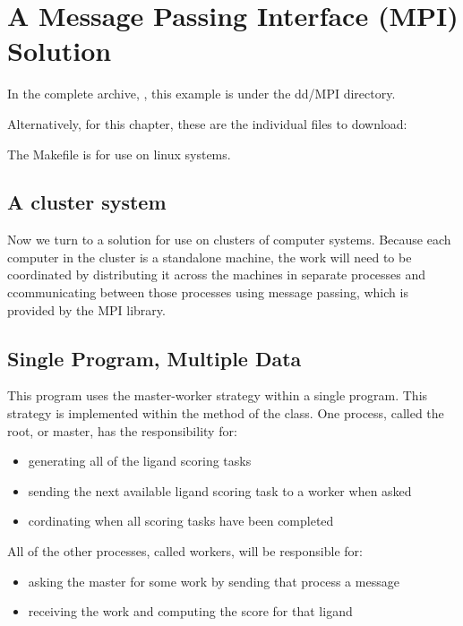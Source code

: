\documentclass[letterpaper,10pt,openany,oneside]{sphinxmanual}
\begin{document}
\section{A Message Passing Interface (MPI) Solution}
\label{mpi/mpi:a-message-passing-interface-mpi-solution}\label{mpi/mpi::doc}
In the complete archive, , this example is under the dd/MPI directory.

Alternatively, for this chapter, these are the individual files to download:



The Makefile is for use on linux systems.


\subsection{A cluster system}
\label{mpi/mpi:a-cluster-system}
Now we turn to a solution for use on clusters of computer systems. Because each computer in the cluster is a standalone machine, the work will need to be coordinated by distributing it across the machines in separate processes and ccommunicating between those processes using message passing, which is provided by the MPI library.


\subsection{Single Program, Multiple Data}
\label{mpi/mpi:single-program-multiple-data}
This program uses the master-worker strategy within a single program. This strategy is implemented within the  method of the  class. One process, called the root, or master, has the responsibility for:
\begin{itemize}
\item {} 
generating all of the ligand scoring tasks

\item {} 
sending the next available ligand scoring task to a worker when asked

\item {} 
cordinating when all scoring tasks have been completed

\end{itemize}

All of the other processes, called workers, will be responsible for:
\begin{itemize}
\item {} 
asking the master for some work by sending that process a message

\item {} 
receiving the work and computing the score for that ligand

\end{itemize}
\end{document}
